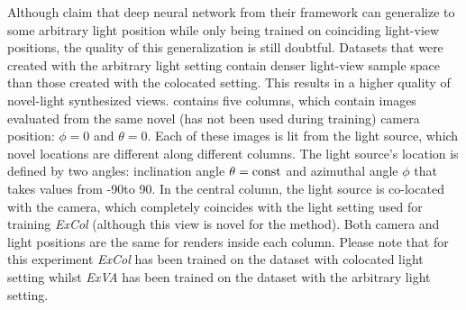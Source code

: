 Although \cite{bi2020neural} claim that deep neural network from their framework
can generalize to some arbitrary light position while only being trained on coinciding light-view positions,
the quality of this generalization is still doubtful.
Datasets that were created with the arbitrary light setting
contain denser light-view sample space than those created with the colocated setting.
This results in a higher quality of novel-light synthesized views.
 contains five columns,
which contain images evaluated from the same novel (has not been used during training) camera position: $\phi = 0$ and $\theta = 0$.
Each of these images is lit from the light source,
which novel locations are different along different columns.
The light source's location is defined by two angles:
inclination angle $\theta = \mathrm{const}$ and azimuthal angle $\phi$
that takes values from -90\textdegree to 90\textdegree.
In the central column, the light source is co-located with the camera,
which completely coincides with the light setting used for training \textit{ExCol}
(although this view is novel for the method).
Both camera and light positions are the same for renders inside each column.
Please note that for this experiment \textit{ExCol} has been trained on the dataset with colocated light setting
whilst \textit{ExVA} has been trained on the dataset with the arbitrary light setting.

